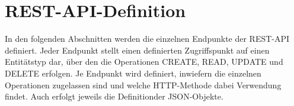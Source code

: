 \chapter{REST-API-Definition}
\label{sec:RESTAPIDefinition}

In den folgenden Abschnitten werden die einzelnen Endpunkte der REST-API definiert.
Jeder Endpunkt stellt einen definierten Zugriffspunkt auf einen Entitätstyp dar, über den die Operationen CREATE, READ, UPDATE und DELETE erfolgen. 
Je Endpunkt wird definiert, inwiefern die einzelnen Operationen zugelassen sind und welche HTTP-Methode dabei Verwendung findet. 
Auch erfolgt jeweils die Definitionder JSON-Objekte.







